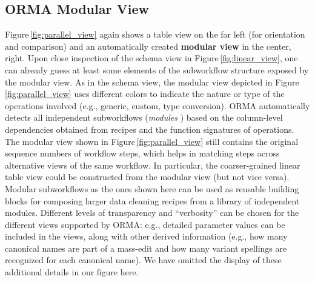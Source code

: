 \documentclass[conference]{ijdc-v14}
\newcommand{\Figref}[1]{Figure\,\ref{#1}}
\newcommand{\orma}{\textsf{ORMA}\xspace}  %
\newcommand{\co}[1]{\textsf{\small{#1}}}
\begin{document}
 
 


 
 


\subsection{\orma Modular View}

\Figref{fig:parallel_view} again shows a table view on the far left (for orientation and comparison)
and an automatically created \textbf{modular view} in the center, right.  Upon close inspection of
the schema view in \Figref{fig:linear_view}, one can already guess at least some elements of the
subworkflow structure exposed by the modular view. As in the schema view, the modular view depicted
in \Figref{fig:parallel_view} uses different colors to indicate the nature or type of the operations
involved (e.g., generic, custom, type conversion). \orma automatically detects all independent
subworkflows (\emph{modules} ) based on the column-level dependencies obtained from recipes and the
function signatures of operations. The modular view shown in \Figref{fig:parallel_view} still
contains the original sequence numbers of workflow steps, which helps in matching steps across
alternative views of the same workflow. In particular, the coarser-grained linear table view could
be constructed from the modular view (but not vice versa).  Modular subworkflows as the ones shown
here can be used as reusable building blocks for composing larger data cleaning recipes from a
library of independent modules. Different levels of transparency and ``verbosity'' can be chosen for
the different views supported by \orma: e.g., detailed parameter values can be included in the
views, along with other derived information (e.g., how many canonical names are part of a
\co{mass-edit} and how many variant spellings are recognized for each canonical name). 
We have omitted the display of these additional details in our figure here.
\end{document}
